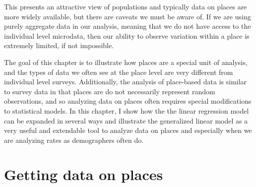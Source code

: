 \documentclass[
  letterpaper,
  DIV=11,
  numbers=noendperiod]{scrreprt}
\begin{document}
This presents an attractive view of populations and typically data on
places are more widely available, but there are caveats we must be aware
of. If we are using purely aggregate data in our analysis, meaning that
we do not have access to the individual level microdata, then our
ability to observe variation within a place is extremely limited, if not
impossible.

The goal of this chapter is to illustrate how places are a special unit
of analysis, and the types of data we often see at the place level are
very different from individual level surveys. Additionally, the analysis
of place-based data is similar to survey data in that places are do not
necessarily represent random observations, and so analyzing data on
places often requires special modifications to statistical models. In
this chapter, I show how the the linear regression model can be expanded
in several ways and illustrate the generalized linear model as a very
useful and extendable tool to analyze data on places and especially when
we are analyzing rates as demographers often do.

\hypertarget{getting-data-on-places-1}{%
\section{Getting data on places}\label{getting-data-on-places-1}}
\end{document}
